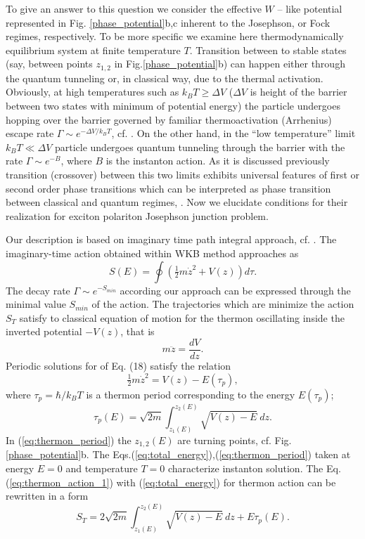 \documentclass[aps, pre, preprint, groupedaddress, superscriptaddress, showkeys, showpacs] {revtex4-1}
\begin{document}
To give an answer to this question we consider the effective $W$ -- like potential represented in Fig. \ref{phase_potential}b,c inherent to the Josephson, or Fock regimes, respectively.
To be more specific we examine here thermodynamically equilibrium system at finite temperature $T$.  Transition between to stable states (say, between points $z_{1,2}$ in Fig.\ref{phase_potential}b) can happen  either through the quantum tunneling or, in classical way, due to the thermal activation. 
Obviously, at high temperatures such as $k_{B}T\ge\Delta V$ ($\Delta V$ is height of the barrier between two states with minimum of potential energy) the particle undergoes hopping over the barrier governed by familiar thermoactivation (Arrhenius) escape rate $\Gamma \sim e^{-\Delta V /k_{B}T}$, cf. \cite{Larkin}.
On the other hand, in the ``low temperature'' limit $k_{B}T\ll\Delta V$ particle undergoes quantum tunneling through the barrier with the rate $\Gamma \sim e^{-B}$, where $B$ is the instanton action.
As it is discussed previously transition (crossover) between this two limits exhibits universal features of first or second order phase transitions which can be interpreted as phase transition between classical and quantum regimes, \cite{Chudnovsky_1997, Larkin, Owerre}.
Now we elucidate conditions for their realization for exciton polariton Josephson junction problem. 

Our description is based on imaginary time path integral approach, cf. \cite{Ankerhold}.
The imaginary-time action obtained within WKB method approaches as
%
\begin{equation}
S(E) = \oint (\tfrac{1}{2} m \dot{z}^2 + V(z)) d \tau.
\label{eq:thermon_action_1}
\end{equation}
%
The decay rate $\Gamma \sim e^{-S_{min}}$ according our approach can be expressed through the minimal value $S_{min}$ of the action.
The trajectories which are minimize the action $S_T$ satisfy to classical equation of motion for the thermon oscillating inside the inverted potential $-V(z)$, that is 
%
\begin{equation}
m \ddot{z} = \frac{d V}{dz}.
\label{eq:thermon}
\end{equation}
%
Periodic solutions for of Eq. (18) satisfy the relation
%
\begin{equation}
\tfrac{1}{2} m \dot{z}^2 = V(z) - E(\tau_p),
\label{eq:total_energy}
\end{equation}
%
where $\tau_p = \hbar / k_B T$ is a thermon period corresponding to the energy $E(\tau_p)$;
%
\begin{equation}
\tau_p(E) = \sqrt{2 m} \int_{z_1(E)}^{z_2(E)} \sqrt{V(z) - E} ~dz.
\label{eq:thermon_period}
\end{equation}
%
In (\ref{eq:thermon_period}) the $z_{1,2}(E)$ are turning points, cf. Fig. \ref{phase_potential}b.
The Eqs.(\ref{eq:total_energy}),(\ref{eq:thermon_period}) taken at energy $E = 0$ and temperature $T = 0$ characterize instanton solution.
The Eq. (\ref{eq:thermon_action_1}) with (\ref{eq:total_energy}) for thermon action can be rewritten in a form 
%
\begin{equation}
S_T = 2 \sqrt{2 m} \int_{z_1(E)}^{z_2(E)} \sqrt{V(z) - E} ~dz + E \tau_p (E).
\label{eq:thermon_action_2}
\end{equation}
%
\end{document}
